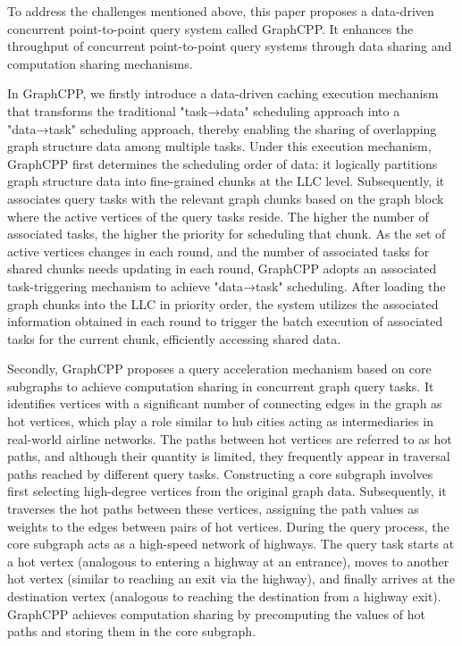 \documentclass[lettersize,journal]{IEEEtran} %
\begin{document}
To address the challenges mentioned above, this paper proposes a data-driven concurrent point-to-point query system called GraphCPP. It enhances the throughput of concurrent point-to-point query systems through data sharing and computation sharing mechanisms.

In GraphCPP, we firstly introduce a data-driven caching execution mechanism that transforms the traditional "task→data" scheduling approach into a "data→task" scheduling approach, thereby enabling the sharing of overlapping graph structure data among multiple tasks. Under this execution mechanism, GraphCPP first determines the scheduling order of data: it logically partitions graph structure data into fine-grained chunks at the LLC level. Subsequently, it associates query tasks with the relevant graph chunks based on the graph block where the active vertices of the query tasks reside. The higher the number of associated tasks, the higher the priority for scheduling that chunk. As the set of active vertices changes in each round, and the number of associated tasks for shared chunks needs updating in each round, GraphCPP adopts an associated task-triggering mechanism to achieve "data→task" scheduling. After loading the graph chunks into the LLC in priority order, the system utilizes the associated information obtained in each round to trigger the batch execution of associated tasks for the current chunk, efficiently accessing shared data.

Secondly, GraphCPP proposes a query acceleration mechanism based on core subgraphs to achieve computation sharing in concurrent graph query tasks. It identifies vertices with a significant number of connecting edges in the graph as hot vertices, which play a role similar to hub cities acting as intermediaries in real-world airline networks. The paths between hot vertices are referred to as hot paths, and although their quantity is limited, they frequently appear in traversal paths reached by different query tasks. Constructing a core subgraph involves first selecting high-degree vertices from the original graph data. Subsequently, it traverses the hot paths between these vertices, assigning the path values as weights to the edges between pairs of hot vertices. During the query process, the core subgraph acts as a high-speed network of highways. The query task starts at a hot vertex (analogous to entering a highway at an entrance), moves to another hot vertex (similar to reaching an exit via the highway), and finally arrives at the destination vertex (analogous to reaching the destination from a highway exit). GraphCPP achieves computation sharing by precomputing the values of hot paths and storing them in the core subgraph.
\end{document}
